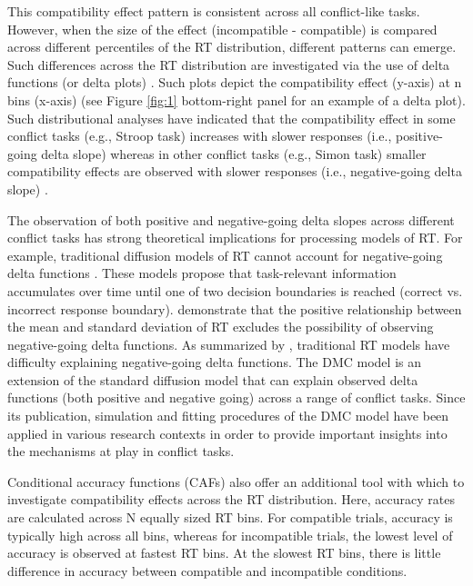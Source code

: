 This compatibility effect pattern is consistent across all conflict-like tasks.
However, when the size of the effect (incompatible - compatible) is compared
across different percentiles of the RT distribution, different patterns can
emerge. Such differences across the RT distribution are investigated via the
use of delta functions (or delta plots) \parencite{de1994conditional,
speckman2008delta}. Such plots depict the compatibility effect (y-axis) at n
bins (x-axis) (see Figure \ref{fig:1} bottom-right panel for an example of a
delta plot). Such distributional analyses have indicated that the compatibility
effect in some conflict tasks (e.g., Stroop task) increases with slower
responses (i.e., positive-going delta slope) whereas in other conflict tasks
(e.g., Simon task) smaller compatibility effects are observed with slower
responses (i.e., negative-going delta slope) \parencite[see][for Stroop and
Simon tasks]{pratte2010exploring}.

The observation of both positive and negative-going delta slopes across
different conflict tasks has strong theoretical implications for processing
models of RT. For example, traditional diffusion models of RT cannot account
for negative-going delta functions \parencite{pratte2010exploring}. These
models propose that task-relevant information accumulates over time until one
of two decision boundaries is reached (correct vs. incorrect response
boundary). \textcite{wagenmakers2007linear} demonstrate that the positive
relationship between the mean and standard deviation of RT excludes the
possibility of observing negative-going delta functions. As summarized by
\textcite{ulrich2015automatic}, traditional RT models have difficulty
explaining negative-going delta functions. The DMC model is an extension of the
standard diffusion model that can explain observed delta functions (both
positive and negative going) across a range of conflict tasks. Since its
publication, simulation and fitting procedures of the DMC model have been
applied in various research contexts in order to provide important insights into
the mechanisms at play in conflict tasks\parencite[e.g.,][]{servant2016,
mittelstadt2020beyond}.

Conditional accuracy functions (CAFs) also offer an additional tool with which
to investigate compatibility effects across the RT distribution. Here, accuracy
rates are calculated across N equally sized RT bins. For compatible trials,
accuracy is typically high across all bins, whereas for incompatible trials,
the lowest level of accuracy is observed at fastest RT bins. At the slowest RT
bins, there is little difference in accuracy between compatible and
incompatible conditions.

